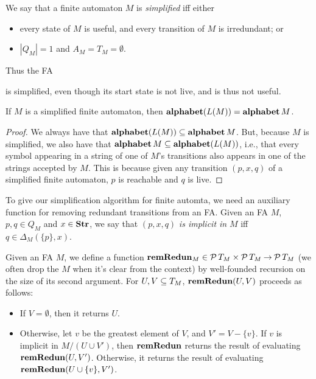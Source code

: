 We say that a finite automaton $M$ is \emph{simplified} iff either
%
%
%
\begin{itemize}
\item every state of $M$ is useful, and every transition of $M$
  is irredundant; or

\item $|Q_M|=1$ and $A_M = T_M = \emptyset$.
\end{itemize}
Thus the FA
\begin{center}

\end{center}
is simplified, even though its start state is not live, and is
thus not useful.

\begin{proposition}
\label{AlphabetSimplifiedFA}
If $M$ is a simplified finite automaton, then
$\mathbf{alphabet}(L(M))=\mathbf{alphabet}\,M$.
\end{proposition}

\begin{proof}
We always have that $\mathbf{alphabet}(L(M))\subseteq\mathbf{alphabet}\,M$.  But, because $M$
is simplified, we also have that $\mathbf{alphabet}\,M\subseteq\mathbf{alphabet}(L(M))$,
i.e., that every symbol appearing in a string of one of $M$'s
transitions also appears in one of the strings accepted by $M$.
This is because given any transition $(p,x,q)$ of a simplified
finite automaton, $p$ is reachable and $q$ is live.
\end{proof}

To give our simplification algorithm for finite automta, we need an
auxiliary function for removing redundant transitions from an FA.
Given an FA $M$, $p,q\in Q_M$ and $x\in\mathbf{Str}$, we say that $(p,x,q)$
\emph{is implicit in} $M$ iff $q\in\Delta_M(\{p\},x)$.

Given an FA $M$, we define a function
$\mathbf{remRedun}_M\in{\cal P} \,T_M\times{\cal P} \,T_M\mathbin{\to}{\cal P} \,T_M$ (we
often drop the $M$ when it's clear from the context) by well-founded
recursion on the size of its second argument.  For $U,V\subseteq T_M$,
$\mathbf{remRedun}(U, V)$ proceeds as follows:
\begin{itemize}
\item If $V=\emptyset$, then it returns $U$.

\item Otherwise, let $v$ be the greatest element of $V$, and $V' = V -
  \{v\}$.  If $v$ is implicit in $M/(U\cup V')$, then $\mathbf{remRedun}$
  returns the result of evaluating $\mathbf{remRedun}(U, V')$.  Otherwise, it
  returns the result of evaluating $\mathbf{remRedun}(U \cup \{v\}, V')$.
\end{itemize}

